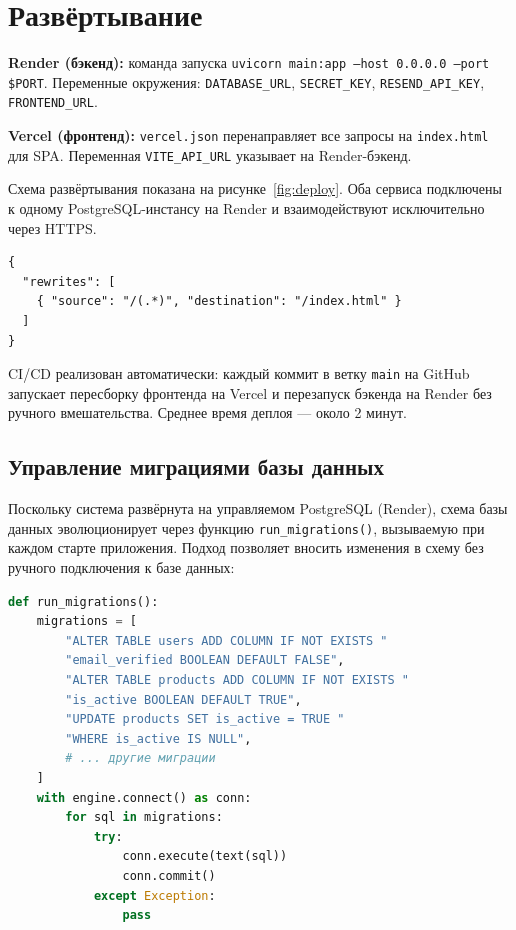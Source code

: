 \documentclass[14pt,a4paper]{extreport}
\begin{document}
\section{Развёртывание}

\textbf{Render (бэкенд):} команда запуска \texttt{uvicorn main:app --host 0.0.0.0 --port \$PORT}. Переменные окружения: \texttt{DATABASE\_URL}, \texttt{SECRET\_KEY}, \texttt{RESEND\_API\_KEY}, \texttt{FRONTEND\_URL}.

\textbf{Vercel (фронтенд):} \texttt{vercel.json} перенаправляет все запросы на \texttt{index.html} для SPA. Переменная \texttt{VITE\_API\_URL} указывает на Render-бэкенд.

Схема развёртывания показана на рисунке~\ref{fig:deploy}. Оба сервиса подключены к одному PostgreSQL-инстансу на Render и взаимодействуют исключительно через HTTPS.

\begin{lstlisting}[language={}, caption={vercel.json — перенаправление маршрутов SPA}]
{
  "rewrites": [
    { "source": "/(.*)", "destination": "/index.html" }
  ]
}
\end{lstlisting}

CI/CD реализован автоматически: каждый коммит в ветку \texttt{main} на GitHub запускает пересборку фронтенда на Vercel и перезапуск бэкенда на Render без ручного вмешательства. Среднее время деплоя — около 2 минут.

\subsection{Управление миграциями базы данных}

Поскольку система развёрнута на управляемом PostgreSQL (Render), схема базы данных эволюционирует через функцию \texttt{run\_migrations()}, вызываемую при каждом старте приложения. Подход позволяет вносить изменения в схему без ручного подключения к базе данных:

\begin{lstlisting}[language=Python, caption={Паттерн инкрементальных миграций (main.py)}]
def run_migrations():
    migrations = [
        "ALTER TABLE users ADD COLUMN IF NOT EXISTS "
        "email_verified BOOLEAN DEFAULT FALSE",
        "ALTER TABLE products ADD COLUMN IF NOT EXISTS "
        "is_active BOOLEAN DEFAULT TRUE",
        "UPDATE products SET is_active = TRUE "
        "WHERE is_active IS NULL",
        # ... другие миграции
    ]
    with engine.connect() as conn:
        for sql in migrations:
            try:
                conn.execute(text(sql))
                conn.commit()
            except Exception:
                pass
\end{lstlisting}
\end{document}
